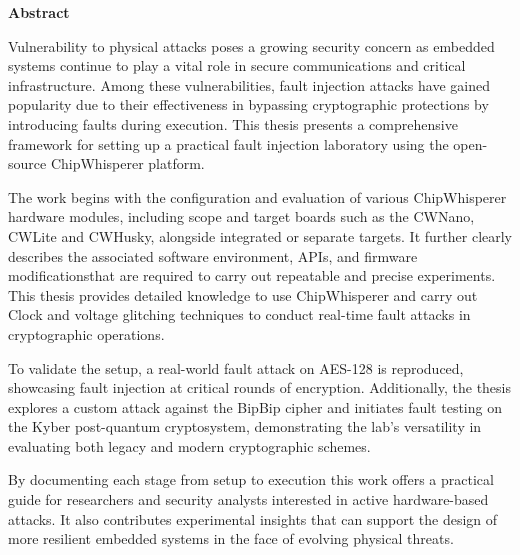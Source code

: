 \cleardoublepage
{}
{}
\thispagestyle{empty}
\textbf{\hspace{0pt plus 1filll}\huge Abstract}
\vspace{15mm}

    Vulnerability to physical attacks poses a growing security concern as embedded systems continue to play a vital role in secure communications and critical infrastructure. Among these  vulnerabilities, fault injection attacks have gained popularity due to their effectiveness in bypassing cryptographic protections by introducing faults during execution. This thesis presents a comprehensive framework for setting up a practical fault injection laboratory using the open-source ChipWhisperer platform.
    
    The work begins with the configuration and evaluation of various ChipWhisperer hardware modules, including scope and target boards such as the CWNano, CWLite and CWHusky, alongside integrated or separate targets. It further clearly describes the associated software environment, APIs, and firmware modificationsthat are required to carry out repeatable and precise experiments. This thesis provides detailed knowledge to use  ChipWhisperer and carry out Clock and voltage glitching techniques to conduct real-time fault attacks in cryptographic operations.
    
    To validate the setup, a real-world fault attack on AES-128 is reproduced, showcasing fault injection at critical rounds of encryption. Additionally, the thesis explores a custom attack against the BipBip cipher and initiates fault testing on the Kyber post-quantum cryptosystem, demonstrating the lab's versatility in evaluating both legacy and modern cryptographic schemes.
    
    By documenting each stage from setup to execution this work offers a practical guide for researchers and security analysts interested in active hardware-based attacks. It also contributes experimental insights that can support the design of more resilient embedded systems in the face of evolving physical threats.
    